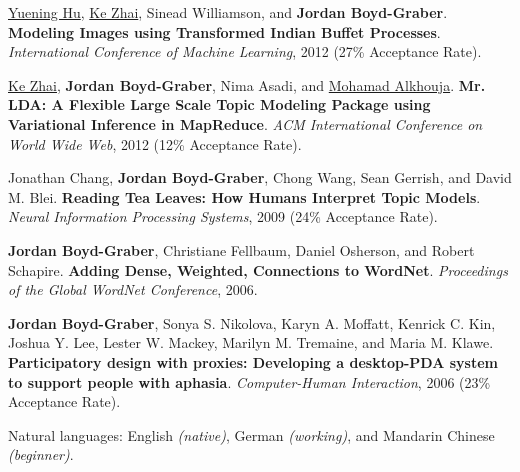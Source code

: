 \documentclass[10pt,a4paper]{article} %
\begin{document}
\begin{multicols}{2}
\begin{enumerate*}
\item \underline{Yuening Hu}, \underline{Ke Zhai}, Sinead Williamson, and
          {\bf Jordan Boyd-Graber}.  {\bf Modeling Images using
            Transformed {I}ndian Buffet Processes}.
          \emph{International Conference of Machine Learning}, 2012
          (27\% Acceptance Rate).

\item \underline{Ke Zhai}, {\bf Jordan Boyd-Graber}, Nima Asadi, and
\underline{Mohamad Alkhouja}.  {\bf {Mr. LDA}: A Flexible Large Scale
  Topic Modeling Package using Variational Inference in MapReduce}.
\emph{ACM International Conference on World Wide Web}, 2012 (12\%
Acceptance Rate).

\item Jonathan Chang, {\bf Jordan Boyd-Graber}, Chong Wang, Sean Gerrish,
and David M. Blei.  {\bf Reading Tea Leaves: How Humans Interpret
  Topic Models}.  \emph{Neural Information Processing Systems}, 2009
(24\% Acceptance Rate).

\item {\bf Jordan Boyd-Graber}, Christiane Fellbaum, Daniel Osherson, and
Robert Schapire.  {\bf Adding Dense, Weighted, Connections to
  {WordNet}}.  \emph{Proceedings of the Global {WordNet} Conference},
2006.

\item {\bf Jordan Boyd-Graber}, Sonya S. Nikolova, Karyn A. Moffatt, Kenrick
C. Kin, Joshua Y. Lee, Lester W. Mackey, Marilyn M. Tremaine, and
Maria M. Klawe.  {\bf Participatory design with proxies: {D}eveloping
  a desktop-{PDA} system to support people with aphasia}.
\emph{Computer-Human Interaction}, 2006 (23\% Acceptance Rate).


\end{enumerate*}

\end{multicols}

\spacedhrule{1.6em}{-0.4em} %


\inlineheadsection %
{Natural languages:}
{English \textit{(native)}, German \textit{(working)}, and Mandarin Chinese \textit{(beginner)}.}

\end{document}
